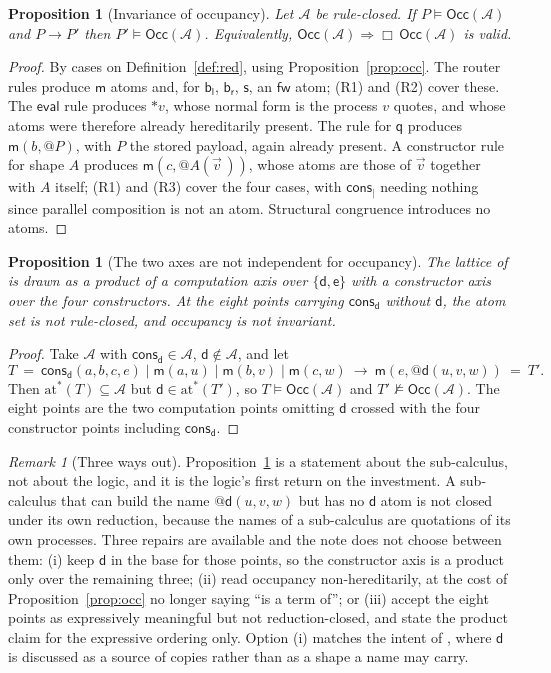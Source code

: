 \documentclass[11pt]{article}
\makeatletter
\theoremstyle{plain}
\newtheorem{proposition}[theorem]{Proposition}
\theoremstyle{definition}
\theoremstyle{remark}
\newtheorem{remark}[theorem]{Remark}
\newcommand{\quo}[1]{@#1}
\newcommand{\drp}[1]{{*}#1}
\newcommand{\mm}{\mathsf{m}}
\newcommand{\dd}{\mathsf{d}}
\newcommand{\fw}{\mathsf{fw}}
\newcommand{\bl}{\mathsf{b}_{\mathsf{l}}}
\newcommand{\br}{\mathsf{b}_{\mathsf{r}}}
\newcommand{\sy}{\mathsf{s}}
\newcommand{\ev}{\mathsf{e}}
\newcommand{\qq}{\mathsf{q}}
\newcommand{\cons}{\mathsf{cons}}
\newcommand{\consp}{\cons_{\mid}}
\newcommand{\consd}{\cons_{\dd}}
\newcommand{\red}{\longrightarrow}
\newcommand{\sat}{\models}
\newcommand{\Occ}{\mathsf{Occ}}
\newcommand{\Atm}{\mathcal{A}}
\newcommand{\atoms}[1]{\mathrm{at}^{*}(#1)}
\makeatother
\begin{document}
\begin{proposition}[Invariance of occupancy]
\label{prop:subjred}
Let $\Atm$ be rule-closed. If $P \sat \Occ(\Atm)$ and $P \red P'$ then
$P' \sat \Occ(\Atm)$. Equivalently, $\Occ(\Atm) \Rightarrow \Box\,\Occ(\Atm)$
is valid.
\end{proposition}

\begin{proof}
By cases on Definition~\ref{def:red}, using Proposition~\ref{prop:occ}. The
router rules produce $\mm$ atoms and, for $\bl$, $\br$, $\sy$, an $\fw$ atom;
(R1) and (R2) cover these. The $\mathsf{eval}$ rule produces $\drp{v}$, whose
normal form is the process $v$ quotes, and whose atoms were therefore already
hereditarily present. The rule for $\qq$
produces $\mm(b,\quo{P})$, with $P$ the stored payload, again already present.
A constructor rule for shape $A$ produces $\mm(c,\quo{A(\vec v\,)})$, whose
atoms are those of $\vec v$ together with $A$ itself; (R1) and (R3) cover the
four cases, with $\consp$ needing nothing since parallel composition is not an
atom. Structural congruence introduces no atoms.
\end{proof}

\begin{proposition}[The two axes are not independent for occupancy]
\label{prop:notindep}
The lattice of \cite[Fig.~2]{rhocomb3} is drawn as a product of a computation
axis over $\{\dd,\ev\}$ with a constructor axis over the four constructors. At
the eight points carrying $\consd$ without $\dd$, the atom set is not
rule-closed, and occupancy is not invariant.
\end{proposition}

\begin{proof}
Take $\Atm$ with $\consd \in \Atm$, $\dd \notin \Atm$, and let
\[
  T \ =\ \consd(a,b,c,e) \mid \mm(a,u) \mid \mm(b,v) \mid \mm(c,w)
  \ \red\ \mm(e,\quo{\dd(u,v,w)}) \ =\ T'.
\]
Then $\atoms{T} \subseteq \Atm$ but $\dd \in \atoms{T'}$, so
$T \sat \Occ(\Atm)$ and $T' \not\sat \Occ(\Atm)$. The eight points are the two
computation points omitting $\dd$ crossed with the four constructor points
including $\consd$.
\end{proof}

\begin{remark}[Three ways out]
\label{rem:waysout}
Proposition~\ref{prop:notindep} is a statement about the sub-calculus, not about
the logic, and it is the logic's first return on the investment. A sub-calculus
that can build the name $\quo{\dd(u,v,w)}$ but has no $\dd$ atom is not closed
under its own reduction, because the names of a sub-calculus are quotations of
its own processes. Three repairs are available and the note does not choose
between them: (i) keep $\dd$ in the base for those points, so the constructor
axis is a product only over the remaining three; (ii) read occupancy
non-hereditarily, at the cost of Proposition~\ref{prop:occ} no longer saying
``is a term of''; or (iii) accept the eight points as expressively meaningful
but not reduction-closed, and state the product claim for the expressive
ordering only. Option (i) matches the intent of \cite[\S9.4]{rhocomb3}, where
$\dd$ is discussed as a source of copies rather than as a shape a name may
carry.
\end{remark}
\end{document}

